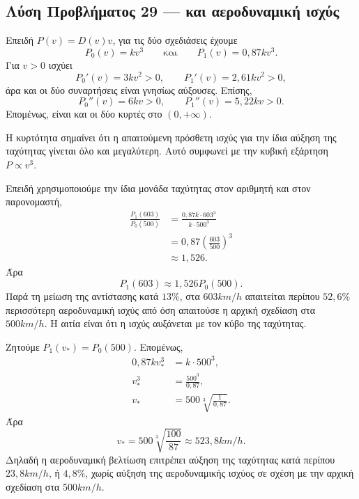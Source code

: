 \subsection*{Λύση Προβλήματος 29 ---  και αεροδυναμική ισχύς}

\begin{alist}
  \item Επειδή $P(v)=D(v)v$, για τις δύο σχεδιάσεις έχουμε
        \[
          {P_0(v)=kv^3}
          \qquad\text{και}\qquad
          {P_1(v)=0{,}87kv^3}.
        \]
        Για $v>0$ ισχύει
        \[
          P_0'(v)=3kv^2>0,
          \qquad
          P_1'(v)=2{,}61kv^2>0,
        \]
        άρα και οι δύο συναρτήσεις είναι γνησίως αύξουσες. Επίσης,
        \[
          P_0''(v)=6kv>0,
          \qquad
          P_1''(v)=5{,}22kv>0.
        \]
        Επομένως, είναι και οι δύο κυρτές στο $(0,+\infty)$.

        Η κυρτότητα σημαίνει ότι η απαιτούμενη πρόσθετη ισχύς για την
        ίδια αύξηση της ταχύτητας γίνεται όλο και μεγαλύτερη. Αυτό
        συμφωνεί με την κυβική εξάρτηση $P\propto v^3$.

  \item Επειδή χρησιμοποιούμε την ίδια μονάδα ταχύτητας στον αριθμητή
        και στον παρονομαστή,
        \begin{align*}
          \frac{P_1(603)}{P_0(500)}
          &=
          \frac{0{,}87k\cdot603^3}{k\cdot500^3}\\
          &=0{,}87\left(\frac{603}{500}\right)^3\\
          &\approx1{,}526.
        \end{align*}
        Άρα
        \[
          {P_1(603)\approx1{,}526P_0(500)}.
        \]
        Παρά τη μείωση της αντίστασης κατά $13\%$, στα
        $603\si{km/h}$ απαιτείται περίπου $52{,}6\%$ περισσότερη
        αεροδυναμική ισχύς από όση απαιτούσε η αρχική σχεδίαση στα
        $500\si{km/h}$. Η αιτία είναι ότι η ισχύς αυξάνεται με τον
        κύβο της ταχύτητας.

  \item Ζητούμε $P_1(v_*)=P_0(500)$. Επομένως,
        \begin{align*}
          0{,}87kv_*^3&=k\cdot500^3,\\
          v_*^3&=\frac{500^3}{0{,}87},\\
          v_*&=500\sqrt[3]{\frac{1}{0{,}87}}.
        \end{align*}
        Άρα
        \[
          {
            v_*=500\sqrt[3]{\frac{100}{87}}
            \approx523{,}8\si{km/h}
          }.
        \]
        Δηλαδή η αεροδυναμική βελτίωση επιτρέπει αύξηση της ταχύτητας
        κατά περίπου $23{,}8\si{km/h}$, ή $4{,}8\%$, χωρίς αύξηση της
        αεροδυναμικής ισχύος σε σχέση με την αρχική σχεδίαση στα
        $500\si{km/h}$.
\end{alist}
